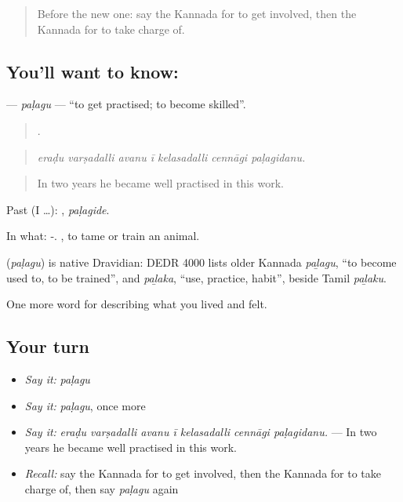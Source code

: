\label{lesson:KA-C520-palagu}



\begin{quote}
Before the new one: say the Kannada for to get involved, then the Kannada for to take charge of.
\end{quote}

\subsection*{You'll want to know: }
\textbf{} — \emph{paḷagu} — \textquotedblleft{}to get practised; to become skilled\textquotedblright{}.

\begin{quote}
      .
\end{quote}

\begin{quote}
\emph{eraḍu varṣadalli avanu ī kelasadalli cennāgi paḷagidanu.}
\end{quote}

\begin{quote}
In two years he became well practised in this work.
\end{quote}

Past (I …): , \emph{paḷagide}.

In what: -. , to tame or train an animal.

\begin{cousinweb}
\textbf{} (\emph{paḷagu}) is native Dravidian: DEDR 4000 lists older Kannada \emph{paḻagu}, \textquotedblleft{}to become used to, to be trained\textquotedblright{}, and \emph{paḻaka}, \textquotedblleft{}use, practice, habit\textquotedblright{}, beside Tamil \emph{paḻaku}.
\end{cousinweb}

\begin{grammarlens}[title={What you've built}]
One more word for describing what you lived and felt.
\end{grammarlens}

\subsection*{Your turn}
\begin{itemize}
\raggedright
  \item \emph{Say it:} \emph{paḷagu}
  \item \emph{Say it:} \emph{paḷagu}, once more
  \item \emph{Say it:} \emph{eraḍu varṣadalli avanu ī kelasadalli cennāgi paḷagidanu.} — In two years he became well practised in this work.
  \item \emph{Recall:} say the Kannada for to get involved, then the Kannada for to take charge of, then say \emph{paḷagu} again
\end{itemize}

